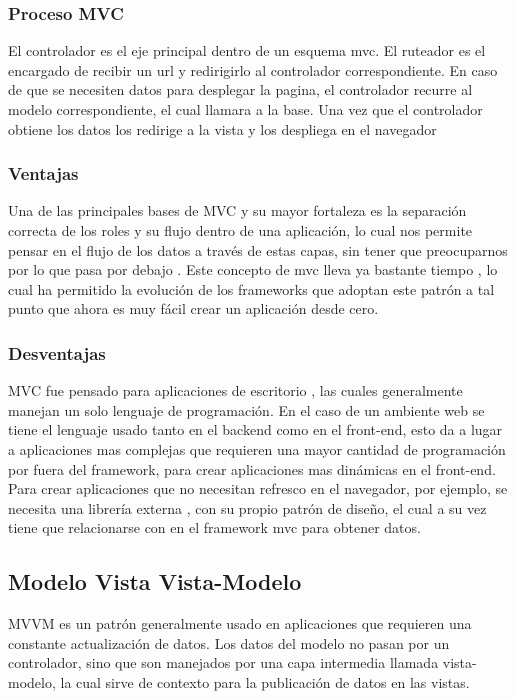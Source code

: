 \subsubsection{Proceso MVC}
El controlador es el eje principal dentro de un esquema mvc. El ruteador es el
encargado de recibir un url y redirigirlo al controlador correspondiente. En
caso de que se necesiten datos para desplegar la pagina, el controlador recurre
al modelo correspondiente, el cual llamara a la base. Una vez que el
controlador obtiene los datos los redirige a la vista y los despliega en el
navegador

\subsubsection{Ventajas}
Una de las principales bases de MVC y su mayor fortaleza es la separación
correcta de los roles y su flujo dentro de una aplicación, lo cual nos permite
pensar en el flujo de los datos a través de estas capas, sin tener que
preocuparnos por lo que pasa por debajo . Este concepto de mvc lleva ya
bastante tiempo , lo cual ha permitido la evolución de los frameworks que
adoptan este patrón a tal punto que ahora es muy fácil crear un aplicación
desde cero.

\subsubsection{Desventajas}
MVC fue pensado para aplicaciones de escritorio , las cuales generalmente
manejan un solo lenguaje de programación. En el caso de un ambiente web se
tiene el lenguaje usado tanto en el backend como en el front-end, esto da a
lugar a aplicaciones mas complejas que requieren una mayor cantidad de programación
por fuera del framework, para crear aplicaciones mas dinámicas en el front-end.
Para crear aplicaciones que no necesitan refresco en el navegador, por ejemplo,
se necesita una librería externa , con su propio patrón de diseño, el cual a su
vez tiene que relacionarse con en el framework mvc para obtener datos.

\subsection{Modelo Vista Vista-Modelo}
MVVM es un patrón generalmente usado en aplicaciones que requieren una
constante actualización de datos. Los datos del modelo no pasan por un
controlador, sino que son manejados por una capa intermedia llamada
vista-modelo, la cual sirve de contexto para la publicación de datos
en las vistas.

